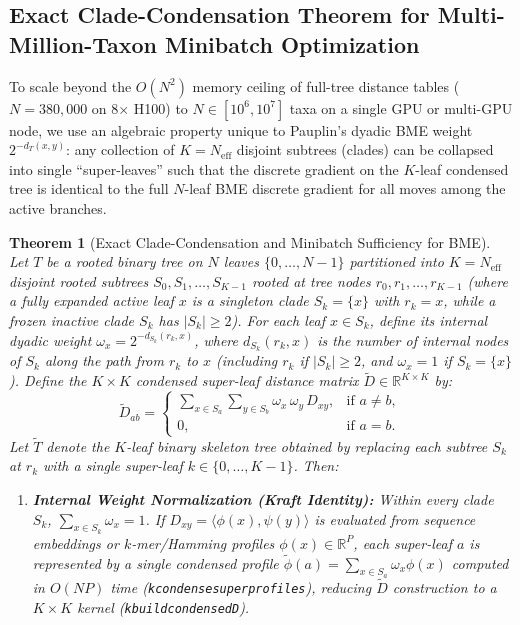 \documentclass[11pt,a4paper]{article}
\makeatletter
\DeclareRobustCommand{\_}{\ifmmode\nfss@text{\textunderscore}\else\textunderscore\allowbreak\fi}
\newtheorem{theorem}{Theorem}[section]
\theoremstyle{definition}
\makeatother
\begin{document}
\subsection{Exact Clade-Condensation Theorem for Multi-Million-Taxon Minibatch Optimization}

To scale beyond the $O(N^2)$ memory ceiling of full-tree distance tables ($N = 380{,}000$ on 8$\times$ H100) to $N \in [10^6, 10^7]$ taxa on a single GPU or multi-GPU node, we use an algebraic property unique to Pauplin's dyadic BME weight $2^{-d_T(x,y)}$: any collection of $K = N_{\text{eff}}$ disjoint subtrees (clades) can be collapsed into single ``super-leaves'' such that the discrete gradient on the $K$-leaf condensed tree is identical to the full $N$-leaf BME discrete gradient for all moves among the active branches.

\begin{theorem}[Exact Clade-Condensation and Minibatch Sufficiency for BME]
\label{thm:clade_condense}
Let $T$ be a rooted binary tree on $N$ leaves $\{0, \dots, N-1\}$ partitioned into $K = N_{\text{eff}}$ disjoint rooted subtrees $S_0, S_1, \dots, S_{K-1}$ rooted at tree nodes $r_0, r_1, \dots, r_{K-1}$ (where a fully expanded active leaf $x$ is a singleton clade $S_k = \{x\}$ with $r_k = x$, while a frozen inactive clade $S_k$ has $|S_k| \ge 2$). For each leaf $x \in S_k$, define its internal dyadic weight $\omega_x = 2^{-d_{S_k}(r_k, x)}$, where $d_{S_k}(r_k, x)$ is the number of internal nodes of $S_k$ along the path from $r_k$ to $x$ (including $r_k$ if $|S_k| \ge 2$, and $\omega_x = 1$ if $S_k = \{x\}$). Define the $K \times K$ condensed super-leaf distance matrix $\widetilde{D} \in \mathbb{R}^{K \times K}$ by:
\begin{equation}
\widetilde{D}_{ab} = \begin{cases}
\displaystyle \sum_{x \in S_a} \sum_{y \in S_b} \omega_x \, \omega_y \, D_{xy}, & \text{if } a \neq b, \\[10pt]
0, & \text{if } a = b.
\end{cases}
\label{eq:condensed_D}
\end{equation}
Let $\widetilde{T}$ denote the $K$-leaf binary skeleton tree obtained by replacing each subtree $S_k$ at $r_k$ with a single super-leaf $k \in \{0, \dots, K-1\}$. Then:
\begin{enumerate}
    \item \textbf{Internal Weight Normalization (Kraft Identity):} Within every clade $S_k$, $\sum_{x \in S_k} \omega_x = 1$. If $D_{xy} = \langle \phi(x), \psi(y) \rangle$ is evaluated from sequence embeddings or $k$-mer/Hamming profiles $\phi(x) \in \mathbb{R}^P$, each super-leaf $a$ is represented by a single condensed profile $\widetilde{\phi}(a) = \sum_{x \in S_a} \omega_x \phi(x)$ computed in $O(N P)$ time (\texttt{k\_condense\_super\_profiles}), reducing $\widetilde{D}$ construction to a $K \times K$ kernel (\texttt{k\_build\_condensed\_D}).

\end{enumerate}
\end{theorem}
\end{document}
